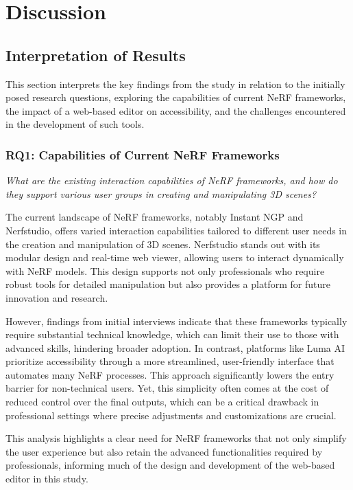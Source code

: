 %
\chapter{Discussion}
\label{sec:discussion}

\section{Interpretation of Results}
\label{sec:discussion:results}

This section interprets the key findings from the study in relation to the initially posed research questions, exploring the capabilities of current NeRF frameworks, the impact of a web-based editor on accessibility, and the challenges encountered in the development of such tools.

\subsection*{RQ1: Capabilities of Current NeRF Frameworks}

\emph{What are the existing interaction capabilities of NeRF frameworks, and how do they support various user groups in creating and manipulating 3D scenes?}

The current landscape of NeRF frameworks, notably Instant NGP and Nerfstudio, offers varied interaction capabilities tailored to different user needs in the creation and manipulation of 3D scenes.
Nerfstudio stands out with its modular design and real-time web viewer, allowing users to interact dynamically with NeRF models.
This design supports not only professionals who require robust tools for detailed manipulation but also provides a platform for future innovation and research.

However, findings from initial interviews indicate that these frameworks typically require substantial technical knowledge, which can limit their use to those with advanced skills, hindering broader adoption.
In contrast, platforms like Luma AI prioritize accessibility through a more streamlined, user-friendly interface that automates many NeRF processes.
This approach significantly lowers the entry barrier for non-technical users.
Yet, this simplicity often comes at the cost of reduced control over the final outputs, which can be a critical drawback in professional settings where precise adjustments and customizations are crucial.

This analysis highlights a clear need for NeRF frameworks that not only simplify the user experience but also retain the advanced functionalities required by professionals, informing much of the design and development of the web-based editor in this study.

